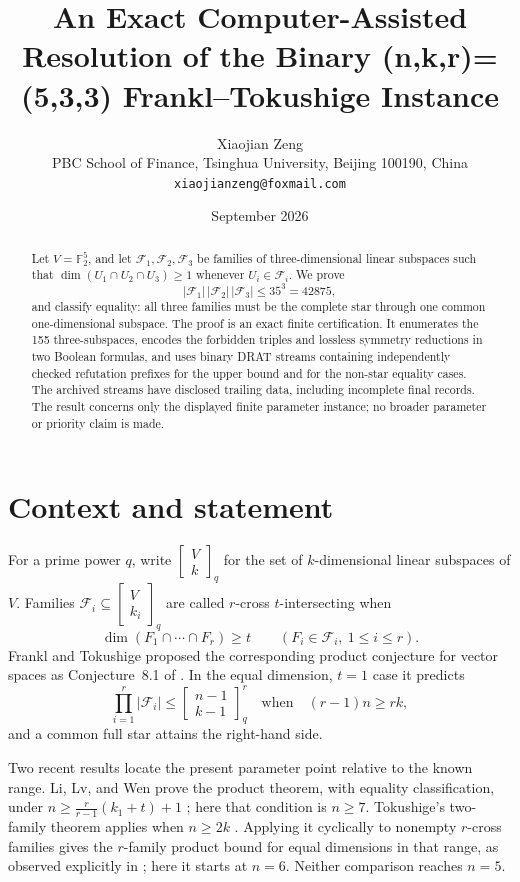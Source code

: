 \documentclass[11pt]{article}
\title{An Exact Computer-Assisted Resolution of the
 Binary (n,k,r)=(5,3,3) Frankl--Tokushige Instance}
\author{Xiaojian Zeng\\
\small PBC School of Finance, Tsinghua University, Beijing 100190, China\\
\small \texttt{xiaojianzeng@foxmail.com}}
\date{September 2026}
\newcommand{\F}{\mathbb F}
\newcommand{\cF}{\mathcal F}
\begin{document}
\maketitle

\begin{abstract}
Let $V=\F_2^5$, and let $\cF_1,\cF_2,\cF_3$ be families of
three-dimensional linear subspaces such that
$\dim(U_1\cap U_2\cap U_3)\geq 1$ whenever $U_i\in\cF_i$.
We prove
\[
  |\cF_1|\,|\cF_2|\,|\cF_3|\leq 35^3=42875,
\]
and classify equality: all three families must be the complete star through
one common one-dimensional subspace.  The proof is an exact finite
certification.  It enumerates the 155 three-subspaces, encodes the forbidden
triples and lossless symmetry reductions in two Boolean formulas, and uses
binary DRAT streams containing independently checked refutation prefixes for
the upper bound and for the non-star equality cases.  The archived streams
have disclosed trailing data, including incomplete final records.  The result
concerns only the displayed finite parameter instance; no broader parameter
or priority claim is made.
\end{abstract}

\section{Context and statement}

For a prime power $q$, write $\left[\begin{smallmatrix}V\\k\end{smallmatrix}\right]_q$ for the set of $k$-dimensional
linear subspaces of $V$.  Families
$\cF_i\subseteq \left[\begin{smallmatrix}V\\k_i\end{smallmatrix}\right]_q$ are called $r$-cross $t$-intersecting when
\[
 \dim(F_1\cap\cdots\cap F_r)\geq t
 \qquad(F_i\in\cF_i,\ 1\leq i\leq r).
\]
Frankl and Tokushige proposed the corresponding product conjecture for
vector spaces as Conjecture~8.1 of \cite{FranklTokushige2016}.  In the equal
dimension, $t=1$ case it predicts
\[
 \prod_{i=1}^r |\cF_i|\leq \left[\begin{smallmatrix}n-1\\k-1\end{smallmatrix}\right]_q^r
 \quad\text{when}\quad (r-1)n\geq rk,
\]
and a common full star attains the right-hand side.

Two recent results locate the present parameter point relative to the known
range.  Li, Lv, and Wen prove the product theorem, with equality
classification, under
$n\geq \frac{r}{r-1}(k_1+t)+1$ \cite[Theorem~1.1]{LiLvWen2026}; here that
condition is $n\geq 7$.  Tokushige's two-family theorem applies when
$n\geq 2k$ \cite[Theorem~2]{Tokushige2013}.  Applying it cyclically to
nonempty $r$-cross families gives the $r$-family product bound for equal
dimensions in that range, as observed explicitly in
\cite[after Theorem~3]{ShimizuTokushige2026}; here it starts at $n=6$.
Neither comparison reaches $n=5$.
\end{document}
